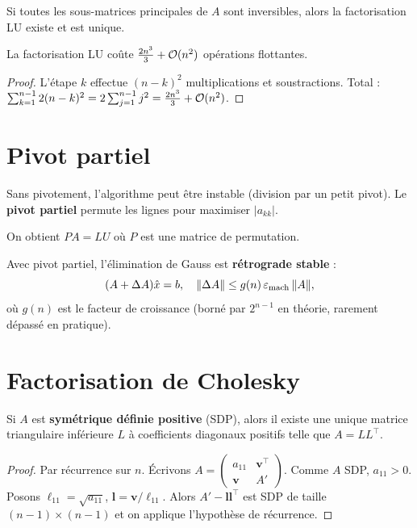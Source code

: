 \begin{theoreme}[Existence de LU]
Si toutes les sous-matrices principales de $A$ sont inversibles, alors la factorisation LU existe et est unique.
\end{theoreme}

\begin{theoreme}[Co\^ut]
La factorisation LU co\^ute $\frac{2n^3}{3}+\mathcal{O}(n^2)$ op\'erations flottantes.
\end{theoreme}

\begin{proof}
L'\'etape $k$ effectue $(n-k)^2$ multiplications et soustractions. Total : $\sum_{k=1}^{n-1}2(n-k)^2=2\sum_{j=1}^{n-1}j^2=\frac{2n^3}{3}+\mathcal{O}(n^2)$.
\end{proof}

\section{Pivot partiel}

\begin{attention}
Sans pivotement, l'algorithme peut \^etre instable (division par un petit pivot). Le \textbf{pivot partiel} permute les lignes pour maximiser $|a_{kk}|$.
\end{attention}

On obtient $PA=LU$ o\`u $P$ est une matrice de permutation.

\begin{theoreme}[Stabilit\'e]
Avec pivot partiel, l'\'elimination de Gauss est \textbf{r\'etrograde stable} :
\[
(A+\Delta A)\hat{x}=b, \quad \|\Delta A\|\leq g(n)\,\varepsilon_{\mathrm{mach}}\,\|A\|,
\]
o\`u $g(n)$ est le facteur de croissance (born\'e par $2^{n-1}$ en th\'eorie, rarement d\'epass\'e en pratique).
\end{theoreme}

\section{Factorisation de Cholesky}

\begin{theoreme}
Si $A$ est \textbf{sym\'etrique d\'efinie positive} (SDP), alors il existe une unique matrice triangulaire inf\'erieure $L$ \`a coefficients diagonaux positifs telle que $A=LL^\top$.
\end{theoreme}

\begin{proof}
Par r\'ecurrence sur $n$. \'Ecrivons $A=\begin{pmatrix}a_{11}&\mathbf{v}^\top\\\mathbf{v}&A'\end{pmatrix}$. Comme $A$ SDP, $a_{11}>0$. Posons $\ell_{11}=\sqrt{a_{11}}$, $\mathbf{l}=\mathbf{v}/\ell_{11}$. Alors $A'- \mathbf{l}\mathbf{l}^\top$ est SDP de taille $(n-1)\times(n-1)$ et on applique l'hypoth\`ese de r\'ecurrence.
\end{proof}

